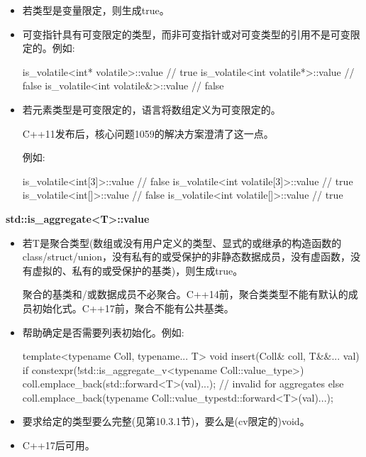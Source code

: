 \begin{itemize}
\item 
若类型是变量限定，则生成true。

\item 
可变指针具有可变限定的类型，而非可变指针或对可变类型的引用不是可变限定的。例如:

\begin{cpp}
is_volatile<int* volatile>::value // true
is_volatile<int volatile*>::value // false
is_volatile<int volatile&>::value // false
\end{cpp}

\item 
若元素类型是可变限定的，语言将数组定义为可变限定的。

\begin{notice}C++11发布后，核心问题1059的解决方案澄清了这一点。
\end{notice}

例如:
\begin{cpp}
is_volatile<int[3]>::value // false
is_volatile<int volatile[3]>::value // true
is_volatile<int[]>::value // false
is_volatile<int volatile[]>::value // true
\end{cpp}
\end{itemize}

\textbf{std::is\_aggregate<T>::value}

\begin{itemize}
\item 
若T是聚合类型(数组或没有用户定义的类型、显式的或继承的构造函数的class/struct/union，没有私有的或受保护的非静态数据成员，没有虚函数，没有虚拟的、私有的或受保护的基类)，则生成true。

\begin{notice}聚合的基类和/或数据成员不必聚合。C++14前，聚合类类型不能有默认的成员初始化式。C++17前，聚合不能有公共基类。
\end{notice}

\item 
帮助确定是否需要列表初始化。例如:
\begin{cpp}
template<typename Coll, typename... T>
void insert(Coll& coll, T&&... val)
{
	if constexpr(!std::is_aggregate_v<typename Coll::value_type>) {
		coll.emplace_back(std::forward<T>(val)...); // invalid for aggregates
	}
	else {
		coll.emplace_back(typename Coll::value_type{std::forward<T>(val)...});
	}
}
\end{cpp}

\item 
要求给定的类型要么完整(见第10.3.1节)，要么是(cv限定的)void。

\item 
C++17后可用。
\end{itemize}

